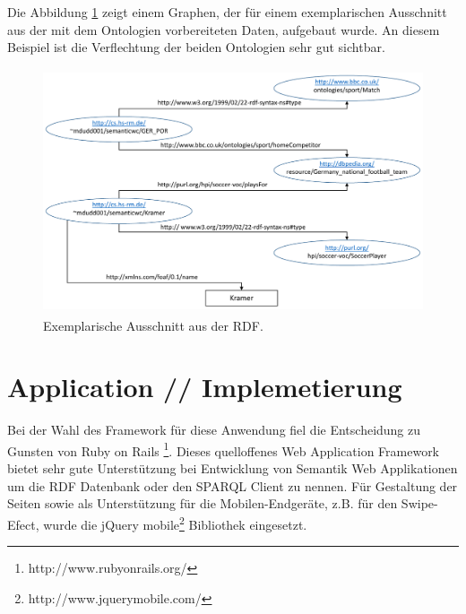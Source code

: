 \documentclass[runningheads,a4paper]{llncs}
\begin{document}
Die Abbildung \ref{fig:example} zeigt einem Graphen, der für einem exemplarischen Ausschnitt aus der mit dem Ontologien vorbereiteten Daten, aufgebaut wurde. An diesem Beispiel ist die Verflechtung der beiden Ontologien sehr gut sichtbar.

\begin{figure}
\centering
\includegraphics[height=7.2cm]{graph_manus}
\caption{Exemplarische Ausschnitt aus der RDF.}
\label{fig:example}
\end{figure}

\newpage
\section{Application // Implemetierung}


Bei der Wahl des Framework für diese Anwendung fiel die Entscheidung zu Gunsten von Ruby on Rails \footnote{http://www.rubyonrails.org/}. Dieses quelloffenes Web Application Framework bietet sehr gute Unterstützung bei Entwicklung von Semantik Web Applikationen um die RDF Datenbank oder den SPARQL Client zu nennen. Für Gestaltung der Seiten sowie als Unterstützung für die Mobilen-Endgeräte, z.B. für den Swipe-Efect,  wurde die jQuery mobile\footnote{http://www.jquerymobile.com/} Bibliothek eingesetzt. 
\end{document}
